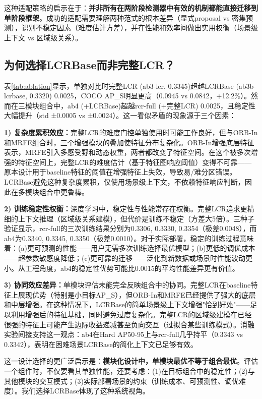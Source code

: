 \documentclass[journal]{IEEEtran}
\begin{document}
这种适配策略的启示在于：\textbf{并非所有在两阶段检测器中有效的机制都能直接迁移到单阶段框架}。成功的适配需要理解两种范式的根本差异（显式proposal vs 密集预测），识别不稳定因素（难度估计方差），并在性能和效率间做出实用权衡（场景级上下文 vs 区域级关系）。


\subsection{为何选择LCRBase而非完整LCR？}
\label{subsec:why_lcrbase}

表\ref{tab:ablation}显示，单独对比时完整LCR (ab3-lcr, 0.3345)超越LCRBase (ab3b-lcrbase, 0.3320) 0.0025，COCO AP\_S明显更高（0.0945 vs 0.0842，+12.2\%）。然而在三模块组合中，ab4 (+LCRBase)超越rcr-full (+完整LCR) 0.0025，且稳定性大幅提升（std ±0.0005 vs ±0.0024）。这一看似矛盾的现象源于三个因素：

\textbf{1) 复杂度累积效应：}完整LCR的难度门控单独使用时可能工作良好，但与ORB-In和MRFE组合时，三个增强模块的叠加使特征分布复杂化。ORB-In增强底层特征表示，MRFE引入多感受野和动态权重，两者都改变了特征空间。在这个被多次增强的特征空间上，完整LCR的难度估计（基于特征图响应阈值）变得不可靠——原本设计用于baseline特征的阈值在增强特征上失效，导致易/难分区错误。LCRBase避免这种复杂度累积，仅使用场景级上下文，不依赖特征响应判断，因此在多模块组合中更鲁棒。

\textbf{2) 训练稳定性权衡：}深度学习中，稳定性与性能常存在权衡。完整LCR追求更精细的上下文推理（区域级关系建模），但代价是训练不稳定（方差大5倍）。三种子验证显示，rcr-full的三次训练结果分别为0.3306, 0.3330, 0.3354（极差0.0048），而ab4为0.3340, 0.3345, 0.3350（极差0.0010）。对于实际部署，稳定的训练过程意味着：(a)更可预测的性能——用户无需多次训练选择最优模型；(b)更低的调优成本——超参数敏感度降低；(c)更可靠的迁移——泛化到新数据或场景时性能波动更小。从工程角度，ab4的稳定性优势可能比0.0015的平均性能差异更有价值。

\textbf{3) 协同效应差异：}单模块评估未能完全反映组合中的协同。完整LCR在baseline特征上展现优势（特别是小目标AP\_S），但ORB-In和MRFE已经提供了强大的底层和中层增强。在这种情况下，LCRBase的简单场景级上下文增强"恰到好处"——足以利用增强后的特征基础，同时避免过度复杂化。完整LCR的区域级建模在已经很强的特征上可能产生边际收益递减甚至负向交互（过拟合某些训练模式）。消融实验间接支持这一观点：ab4在Hard AP50-95上与rcr-full几乎持平（0.3343 vs 0.3342），表明在困难场景LCRBase的简化上下文已足够有效。

这一设计选择的更广泛启示是：\textbf{模块化设计中，单模块最优不等于组合最优}。评估一个组件时，不仅要看其单独性能，还要考虑：(1)在目标组合中的稳定性；(2)与其他模块的交互模式；(3)实际部署场景的约束（训练成本、可预测性、调优难度）。我们选择LCRBase体现了这种系统视角。
\end{document}
